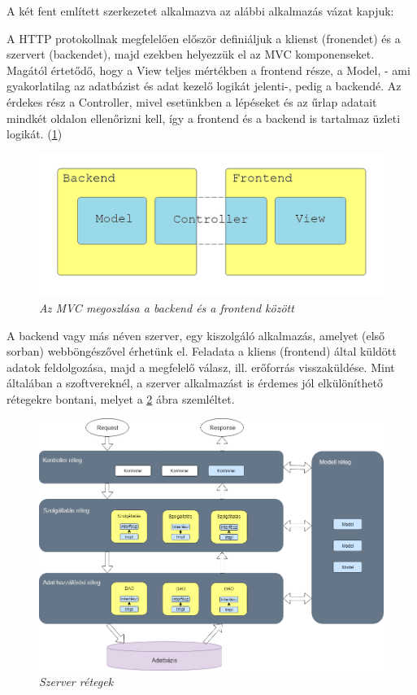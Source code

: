 
A két fent említett szerkezetet alkalmazva az alábbi alkalmazás vázat kapjuk:

A HTTP protokollnak megfelelően először definiáljuk a klienst (fronendet) és a szervert (backendet), majd ezekben helyezzük el az MVC komponenseket. Magától értetődő, hogy a View teljes mértékben a frontend része, a Model, - ami gyakorlatilag az adatbázist és adat kezelő logikát jelenti-, pedig a backendé. Az érdekes rész a Controller, mivel esetünkben a lépéseket és az űrlap adatait mindkét oldalon ellenőrizni kell, így a frontend és a backend is tartalmaz üzleti logikát. (\ref{fig:mixed-arch})
\begin{figure}[!h]
	\centering
	\includegraphics[width=0.5\linewidth]{kepek/mixed-arch.png}
	\caption{\textit{Az MVC megoszlása a backend és a frontend között}}
	\label{fig:mixed-arch}
\end{figure}


A backend vagy más néven szerver, egy kiszolgáló alkalmazás, amelyet (első sorban) webböngészővel érhetünk el. Feladata a kliens (frontend) által küldött adatok feldolgozása, majd a megfelelő válasz, ill. erőforrás visszaküldése. Mint általában a szoftvereknél, a szerver alkalmazást is érdemes jól elkülöníthető rétegekre bontani, melyet a \ref{fig:server-layers} ábra szemléltet.

\begin{figure}[!h]
	\centering
	\includegraphics[width=0.9\linewidth]{kepek/server-layers-colored.png}
	\caption{\textit{Szerver rétegek}}
	\label{fig:server-layers}
\end{figure}

